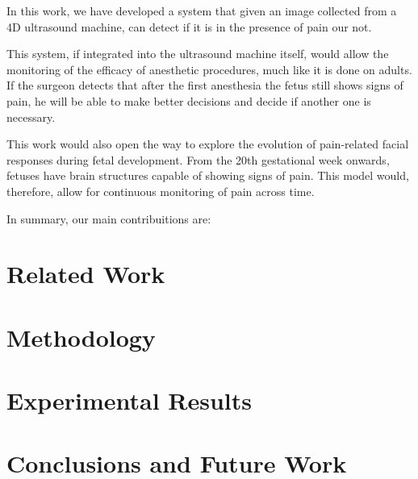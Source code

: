 \documentclass[msc]{ppgccufmg}
\begin{document}
In this work, we have developed a system that given an image collected from a 4D ultrasound machine, can detect if it is in the presence of pain our not. 

This system, if integrated into the ultrasound machine itself, would allow the monitoring of the efficacy of anesthetic procedures, much like it is done on adults. If the surgeon detects that after the first anesthesia the fetus still shows signs of pain, he will be able to make better decisions and decide if another one is necessary.

This work would also open the way to explore the evolution of pain-related facial responses during fetal development. From the 20th gestational week onwards, fetuses have brain structures capable of showing signs of pain. This model would, therefore, allow for continuous monitoring of pain across time.

In summary, our main contribuitions are:

\chapter{Related Work}
\chapter{Methodology}
\chapter{Experimental Results}
\chapter{Conclusions and Future Work}

\end{document}
